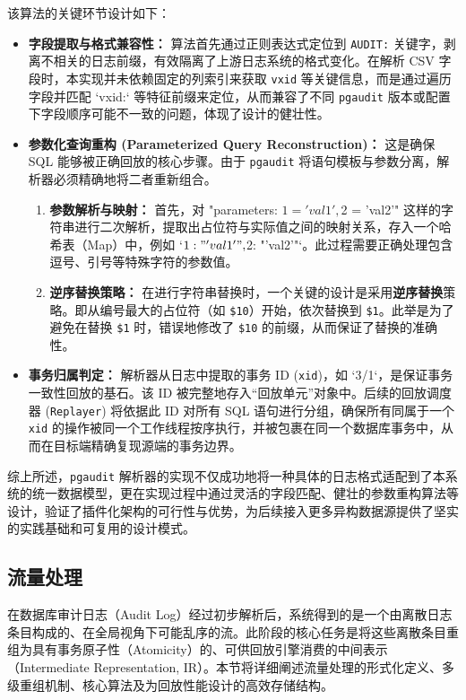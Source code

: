该算法的关键环节设计如下：
\begin{itemize}
    \item \textbf{字段提取与格式兼容性：} 算法首先通过正则表达式定位到 \texttt{AUDIT:} 关键字，剥离不相关的日志前缀，有效隔离了上游日志系统的格式变化。在解析 CSV 字段时，本实现并未依赖固定的列索引来获取 \texttt{vxid} 等关键信息，而是通过遍历字段并匹配 `vxid:` 等特征前缀来定位，从而兼容了不同 \texttt{pgaudit} 版本或配置下字段顺序可能不一致的问题，体现了设计的健壮性。

    \item \textbf{参数化查询重构 (Parameterized Query Reconstruction)：} 这是确保 SQL 能够被正确回放的核心步骤。由于 \texttt{pgaudit} 将语句模板与参数分离，解析器必须精确地将二者重新组合。
    \begin{enumerate}
        \item \textbf{参数解析与映射：} 首先，对 "parameters: $1 = 'val1', $2 = 'val2'" 这样的字符串进行二次解析，提取出占位符与实际值之间的映射关系，存入一个哈希表（Map）中，例如 `{$1: "'val1'", $2: "'val2'"}`。此过程需要正确处理包含逗号、引号等特殊字符的参数值。
        \item \textbf{逆序替换策略：} 在进行字符串替换时，一个关键的设计是采用\textbf{逆序替换}策略。即从编号最大的占位符（如 \texttt{\$10}）开始，依次替换到 \texttt{\$1}。此举是为了避免在替换 \texttt{\$1} 时，错误地修改了 \texttt{\$10} 的前缀，从而保证了替换的准确性。
    \end{enumerate}

    \item \textbf{事务归属判定：} 解析器从日志中提取的事务 ID (\texttt{xid})，如 `3/1`，是保证事务一致性回放的基石。该 ID 被完整地存入“回放单元”对象中。后续的回放调度器 (\texttt{Replayer}) 将依据此 ID 对所有 SQL 语句进行分组，确保所有同属于一个 \texttt{xid} 的操作被同一个工作线程按序执行，并被包裹在同一个数据库事务中，从而在目标端精确复现源端的事务边界。
\end{itemize}

综上所述，\texttt{pgaudit} 解析器的实现不仅成功地将一种具体的日志格式适配到了本系统的统一数据模型，更在实现过程中通过灵活的字段匹配、健壮的参数重构算法等设计，验证了插件化架构的可行性与优势，为后续接入更多异构数据源提供了坚实的实践基础和可复用的设计模式。

\subsection{流量处理}
在数据库审计日志（Audit Log）经过初步解析后，系统得到的是一个由离散日志条目构成的、在全局视角下可能乱序的流。此阶段的核心任务是将这些离散条目重组为具有事务原子性（Atomicity）的、可供回放引擎消费的中间表示（Intermediate Representation, IR）。本节将详细阐述流量处理的形式化定义、多级重组机制、核心算法及为回放性能设计的高效存储结构。

